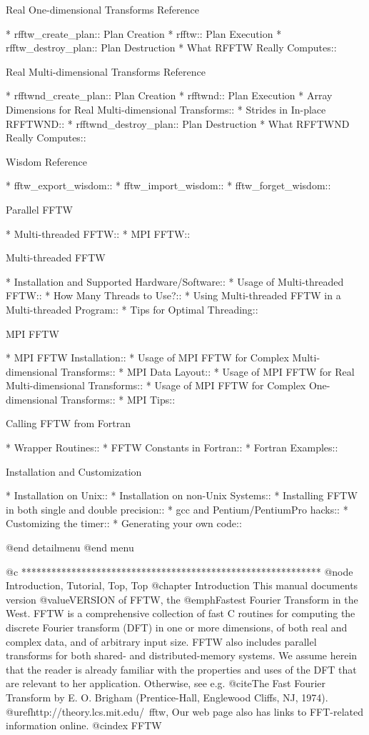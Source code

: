 Real One-dimensional Transforms Reference

* rfftw_create_plan::           Plan Creation   
* rfftw::                       Plan Execution  
* rfftw_destroy_plan::          Plan Destruction
* What RFFTW Really Computes::  

Real Multi-dimensional Transforms Reference

* rfftwnd_create_plan::         Plan Creation
* rfftwnd::                     Plan Execution
* Array Dimensions for Real Multi-dimensional Transforms::  
* Strides in In-place RFFTWND::  
* rfftwnd_destroy_plan::        Plan Destruction
* What RFFTWND Really Computes::  

Wisdom Reference

* fftw_export_wisdom::          
* fftw_import_wisdom::          
* fftw_forget_wisdom::          

Parallel FFTW

* Multi-threaded FFTW::         
* MPI FFTW::                    

Multi-threaded FFTW

* Installation and Supported Hardware/Software::  
* Usage of Multi-threaded FFTW::  
* How Many Threads to Use?::    
* Using Multi-threaded FFTW in a Multi-threaded Program::  
* Tips for Optimal Threading::  

MPI FFTW

* MPI FFTW Installation::       
* Usage of MPI FFTW for Complex Multi-dimensional Transforms::  
* MPI Data Layout::             
* Usage of MPI FFTW for Real Multi-dimensional Transforms::  
* Usage of MPI FFTW for Complex One-dimensional Transforms::  
* MPI Tips::                    

Calling FFTW from Fortran

* Wrapper Routines::            
* FFTW Constants in Fortran::   
* Fortran Examples::            

Installation and Customization

* Installation on Unix::        
* Installation on non-Unix Systems::  
* Installing FFTW in both single and double precision::  
* gcc and Pentium/PentiumPro hacks::  
* Customizing the timer::       
* Generating your own code::    

@end detailmenu
@end menu

@c ************************************************************
@node    Introduction, Tutorial, Top, Top
@chapter Introduction
This manual documents version @value{VERSION} of FFTW, the @emph{Fastest
Fourier Transform in the West}.  FFTW is a comprehensive collection of
fast C routines for computing the discrete Fourier transform (DFT) in
one or more dimensions, of both real and complex data, and of arbitrary
input size.  FFTW also includes parallel transforms for both shared- and
distributed-memory systems.  We assume herein that the reader is already
familiar with the properties and uses of the DFT that are relevant to
her application.  Otherwise, see e.g. @cite{The Fast Fourier Transform}
by E. O. Brigham (Prentice-Hall, Englewood Cliffs, NJ, 1974).
@uref{http://theory.lcs.mit.edu/~fftw, Our web page} also has links to
FFT-related information online.
@cindex FFTW

